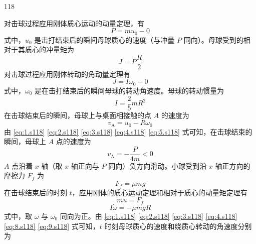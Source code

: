 \begin{solution}{118}
    \begin{subsolution}
        对击球过程应用刚体质心运动的动量定理，有
        \begin{equation}
            P = m u_{0} - 0
            \label{eq:1.s118}
        \end{equation}
        式中，$u_{0}$ 是击打结束后的瞬间母球质心的速度（与冲量 $P$ 同向）。母球受到的相对于其质心的冲量矩为
        \begin{equation}
            J = P \frac{R}{2}
            \label{eq:2.s118}
        \end{equation}
        对击球过程应用刚体转动的角动量定理有
        \begin{equation}
            J = I \omega_{0} - 0
            \label{eq:3.s118}
        \end{equation}
        式中，$\omega_{0}$ 是在击打结束后的瞬间母球的转动角速度。母球的转动惯量为
        \begin{equation}
            I = \frac{2}{5} m R^{2}
            \label{eq:4.s118}
        \end{equation}
        在击球结束后的瞬间，母球上与桌面相接触的点 $A$ 的速度为
        \begin{equation}
            v_{\mathrm{A}} = u_{0} - R \omega_{0}
            \label{eq:5.s118}
        \end{equation}
        由 \eqref{eq:1.s118} \eqref{eq:2.s118} \eqref{eq:3.s118} \eqref{eq:4.s118} \eqref{eq:5.s118} 式可知，在击球结束的瞬间，母球上 $A$ 点的速度为
        \begin{equation}
            v_{\mathrm{A}} = -\frac{P}{4m} < 0
            \label{eq:6.s118}
        \end{equation}
        $A$ 点沿着 $x$ 轴（取 $x$ 轴正向与 $P$ 同向）负方向滑动。小球受到沿 $x$ 轴正方向的摩擦力 $F_{f}$ 为
        \begin{equation}
            F_{f} = \mu m g
            \label{eq:7.s118}
        \end{equation}
        在击球结束后的时刻 $t$，应用刚体的质心运动定理和相对于质心的动量矩定理有
        \begin{equation}
            m \dot{u} = F_{f}
            \label{eq:8.s118}
        \end{equation}
        \begin{equation}
            I \dot{\omega} = -\mu m g R
            \label{eq:9.s118}
        \end{equation}
        式中，取 $\omega$ 与 $\omega_{0}$ 同向为正。由 \eqref{eq:1.s118} \eqref{eq:2.s118} \eqref{eq:3.s118} \eqref{eq:4.s118} \eqref{eq:8.s118} \eqref{eq:9.s118} 式可知，$t$ 时刻母球质心的速度和绕质心转动的角速度分别为

\end{subsolution}
\end{solution}
